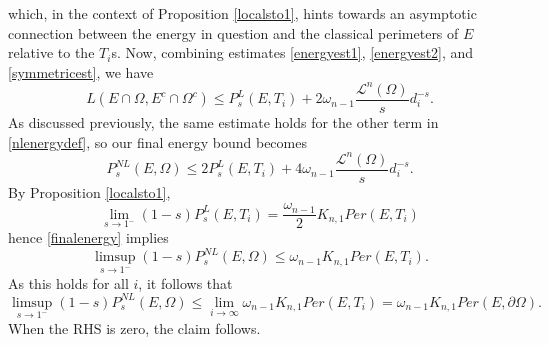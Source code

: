 \documentclass[../main.tex]{subfiles}
\begin{document}
which, in the context of Proposition \ref{localsto1}, hints towards an asymptotic connection between the energy in question and the classical perimeters of $ E $ relative to the $ T_{i} $s. Now, combining estimates \ref{energyest1}, \ref{energyest2}, and \ref{symmetricest}, we have
\[
    L(E\cap \Omega, E^{c}\cap \Omega^{c}) \leq P_{s}^{L}(E,T_{i}) + 2 \omega_{n-1}\frac{\mathcal{L}^{n}(\Omega)}{s}d_{i}^{-s}.
\]
As discussed previously, the same estimate holds for the other term in \ref{nlenergydef}, so our final energy bound becomes
\begin{equation}\label{finalenergy}
    P_{s}^{NL}(E,\Omega) \leq 2P_{s}^{L}(E,T_{i}) + 4 \omega_{n-1}\frac{\mathcal{L}^{n}(\Omega)}{s}d_{i}^{-s}.
\end{equation}
By Proposition \ref{localsto1}, 
\[
    \lim_{s\to1^{-}}(1-s)P_{s}^{L}(E,T_{i}) = \frac{\omega_{n-1}}{2}K_{n,1}Per(E,T_{i})
\]
hence \ref{finalenergy} implies
\[
    \limsup_{s\to1^{-}}(1-s)P_{s}^{NL}(E,\Omega) \leq \omega_{n-1}K_{n,1}Per(E,T_{i}).
\]
As this holds for all $ i $, it follows that 
\[
    \limsup_{s\to1^{-}}(1-s)P_{s}^{NL}(E,\Omega) \leq \lim_{i\to\infty}\omega_{n-1}K_{n,1}Per(E,T_{i}) = \omega_{n-1}K_{n,1}Per(E,\partial \Omega).
\]
When the RHS is zero, the claim follows.
\end{document}
